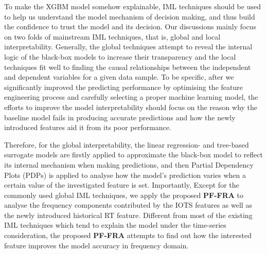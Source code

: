 \documentclass[11pt]{article}
\begin{document}
    To make the XGBM model somehow explainable, IML techniques should be used to help us understand the model mechanism of decision making, and thus build the confidence to trust the model and its decision. Our discussions mainly focus on two folds of mainstream IML techniques, that is, global and local interpretability. Generally, the global techniques attempt to reveal the internal logic of the black-box models to increase their transparency and the local techniques fit well to finding the causal relationships between the independent and dependent variables for a given data sample\citep{du2019techniques}. To be specific, after we significantly improved the predicting performance by optimising the feature engineering process and carefully selecting a proper machine learning model, the efforts to improve the model interpretability should focus on the reason why the baseline model fails in producing accurate predictions and how the newly introduced features aid it from its poor performance.
    
    Therefore, for the global interpretability, the linear regression- and tree-based surrogate models are firstly applied to approximate the black-box model to reflect its internal mechanism when making predictions, and then Partial Dependency Plots (PDPs)\citep{friedman2001greedy} is applied to analyse how the model’s prediction varies when a certain value of the investigated feature is set. Importantly, Except for the commonly used global IML techniques, we apply the proposed \textbf{PF-FRA} to analyse the frequency components contributed by the IOTS features as well as the newly introduced historical RT feature. Different from most of the existing IML techniques which tend to explain the model under the time-series consideration, the proposed \textbf{PF-FRA} attempts to find out how the interested feature improves the model accuracy in frequency domain.
    
\end{document}

